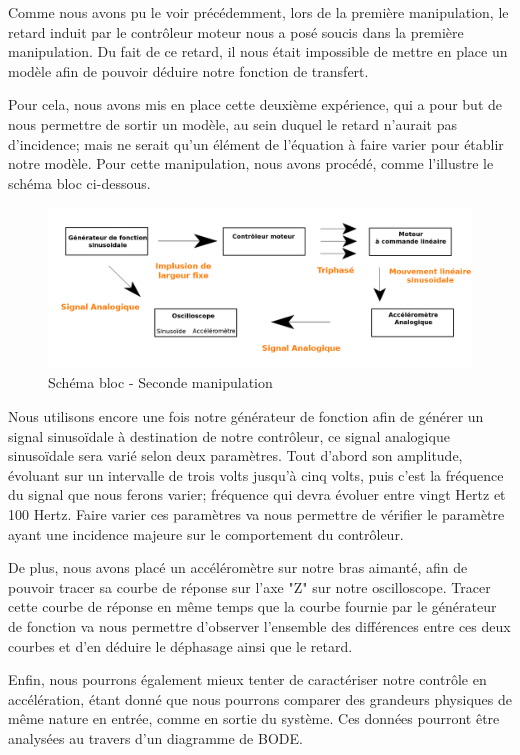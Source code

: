 \documentclass[french,a4paper,12pt]{report}
\begin{document}
		Comme nous avons pu le voir précédemment, lors de la première manipulation, le retard induit par le contrôleur moteur nous a posé soucis dans la première manipulation. Du fait de ce retard, il nous était impossible de mettre en place un modèle afin de pouvoir déduire notre fonction de transfert.
		
		Pour cela, nous avons mis en place cette deuxième expérience, qui a pour but de nous permettre de sortir un modèle, au sein duquel le retard n'aurait pas d'incidence; mais ne serait qu'un élément de l'équation à faire varier pour établir notre modèle. Pour cette manipulation, nous avons procédé, comme l'illustre le schéma bloc ci-dessous.		
		
	\begin{figure}[!ht]
    \center
  	\includegraphics[width=18cm]{manip2.png}
    \caption{Schéma bloc - Seconde manipulation}
	\end{figure}	
	
		Nous utilisons encore une fois notre générateur de fonction afin de générer un signal sinusoïdale à destination de notre contrôleur, ce signal analogique sinusoïdale sera varié selon deux paramètres. Tout d'abord son amplitude, évoluant sur un intervalle de trois volts jusqu'à cinq volts, puis c'est la fréquence du signal que nous ferons varier; fréquence qui devra évoluer entre vingt Hertz et 100 Hertz.	Faire varier ces paramètres va nous permettre de vérifier le paramètre ayant une incidence majeure sur le comportement du contrôleur.

	De plus, nous avons placé un accéléromètre sur notre bras aimanté, afin de pouvoir tracer sa courbe de réponse sur l'axe "Z" sur notre oscilloscope. Tracer cette courbe de réponse en même temps que la courbe fournie par le générateur de fonction va nous permettre d'observer l'ensemble des différences entre ces deux courbes et d'en déduire le déphasage ainsi que le retard.
	
	Enfin, nous pourrons également mieux tenter de caractériser notre contrôle en accélération, étant donné que nous pourrons comparer des grandeurs physiques de même nature en entrée, comme en sortie du système. Ces données pourront être analysées au travers d'un diagramme de BODE.
	
\end{document}
